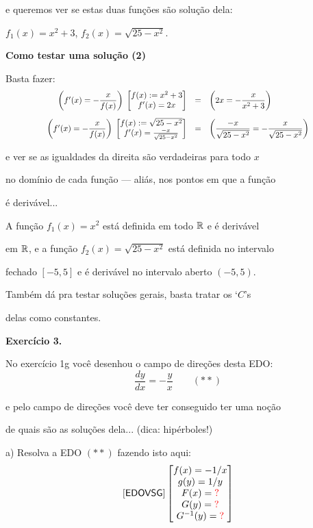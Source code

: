 \documentclass[oneside,12pt]{article}
\begin{document}
e queremos ver se estas duas funções são solução dela:

$f_1(x) = x^2 + 3$, $f_2(x) = \sqrt{25-x^2}$.

\newpage

{\bf Como testar uma solução (2)}

Basta fazer:
%
$$\scalebox{0.85}{$
  \begin{array}{rcll}
  \left( f'(x) = \D -\frac{x}{f(x)} \right)
  \; \bmat{ f(x) := x^2 + 3 \\ f'(x) = 2x }
  &=&
  \left( 2x = \D -\frac{x}{x^2+3} \right)
  \\[15pt]
  \left( f'(x) = \D -\frac{x}{f(x)} \right)
  \; \bmat{ f(x) := \sqrt{25-x^2} \\ f'(x) = \frac{-x}{\sqrt{25-x^2}} }
  &=&
  \left( \D \frac{-x}{\sqrt{25-x^2}} = \D -\frac{x}{\sqrt{25-x^2}} \right)
  \\
  \end{array}
  $}
$$

e ver se as igualdades da direita são verdadeiras para todo $x$

no domínio de cada função --- aliás, nos pontos em que a função

é derivável...

\msk

A função $f_1(x)=x^2$ está definida em todo $\mathbb{R}$ e é derivável

em $\mathbb{R}$, e a função $f_2(x) = \sqrt{25-x^2}$ está definida no intervalo

fechado $[-5,5]$ e é derivável no intervalo aberto $(-5,5)$.

\msk

Também dá pra testar soluções gerais, basta tratar os `$C$'s

delas como constantes.

\newpage


{\bf Exercício 3.}

No exercício 1g você desenhou o campo de direções desta EDO:
%
$$ \frac{dy}{dx} = - \frac{y}{x} \qquad (**)$$

e pelo campo de direções você deve ter conseguido ter uma noção

de quais são as soluções dela... (dica: hipérboles!)

\msk

a) Resolva a EDO $(**)$ fazendo isto aqui:
%
$$\pfo{EDOVSG}
  \bmat{f(x) = -1/x \\
        g(y) = 1/y \\
        F(x) = \Rd{?} \\
        G(y) = \Rd{?} \\
        G^{-1}(y) = \Rd{?} \\
        }
$$
\end{document}
